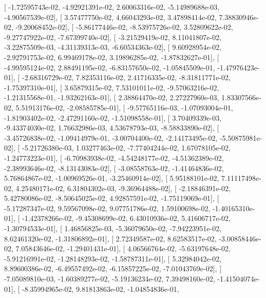 \documentclass{article}
\begin{document}
       [ -1.72595743e-02,  -4.92921391e-02,   2.60063316e-02,
         -5.14989688e-03,  -4.90567539e-02],
       [  3.57477750e-02,   4.66043293e-02,   3.47898414e-02,
          7.38830946e-02,  -9.20068452e-02],
       [ -5.86177446e-02,  -8.53975726e-02,   3.52809622e-02,
         -9.27747922e-02,  -7.67399740e-02],
       [ -3.21529419e-02,   8.11041807e-02,  -3.22875509e-03,
         -4.31139313e-03,  -6.60534363e-02],
       [  9.60928954e-02,  -2.92791753e-02,   6.99469178e-02,
          3.19896285e-02,  -1.87832627e-01],
       [ -4.99595124e-02,   2.88491195e-02,  -6.83157650e-02,
         -1.05845509e-01,  -1.47976423e-01],
       [ -2.68316729e-02,   7.82353116e-02,   2.41716335e-02,
         -8.31811771e-02,  -1.75397310e-01],
       [  3.65879315e-02,   7.53101011e-02,  -9.57063216e-02,
         -1.21315568e-01,  -1.93262163e-01],
       [  2.38864470e-02,   2.27227960e-03,   1.83307566e-02,
          5.51913176e-02,  -2.08585785e-01],
       [ -9.57765116e-03,  -1.07093004e-01,  -1.81903402e-02,
         -2.47291160e-02,  -1.51098558e-01],
       [  3.70409339e-03,  -9.43374030e-02,   1.76632986e-03,
          4.53678793e-03,  -8.58833890e-02],
       [ -3.45726838e-02,  -1.09414979e-01,  -3.00704400e-02,
         -2.14173495e-02,  -5.50875981e-02],
       [ -5.21726380e-03,   1.03277463e-02,  -7.77404244e-02,
          1.67078105e-02,  -1.24773223e-01],
       [ -6.70983938e-02,  -4.54248177e-02,  -4.51362389e-02,
         -2.38993646e-02,  -8.13143083e-02],
       [ -3.08558763e-02,  -1.41464836e-02,   5.76864867e-02,
         -1.00969526e-01,  -3.25460914e-02],
       [  5.95188101e-02,   7.11117498e-02,   4.25480171e-02,
          6.31804302e-03,  -9.36964488e-02],
       [ -2.18846391e-02,   5.42780086e-02,  -8.50645025e-02,
          4.92857591e-02,  -1.75119069e-01],
       [ -5.17287347e-02,   9.59567098e-02,   9.07751786e-02,
          1.59100698e-02,  -1.40165310e-01],
       [ -1.42378266e-02,  -9.45308699e-02,   6.43010936e-02,
          5.41606717e-02,  -1.30794533e-01],
       [  1.46856825e-03,  -5.36079650e-02,  -7.94223951e-02,
          8.62461320e-02,  -1.31806892e-01],
       [  2.72349587e-02,   8.62583517e-02,  -3.00858446e-02,
          7.05843646e-02,  -1.29401431e-01],
       [  4.06566764e-02,  -5.63197648e-02,  -5.91216991e-02,
         -1.28148293e-02,  -1.58787311e-01],
       [  5.32984042e-02,   8.89600386e-02,  -6.49557492e-02,
         -6.15857225e-02,  -7.01043769e-02],
       [ -7.05089810e-03,  -1.60389277e-02,  -5.19136234e-02,
          7.39498160e-02,  -1.41504074e-01],
       [ -8.35994965e-02,   9.81813863e-02,  -1.04854836e-01,
\end{document}
